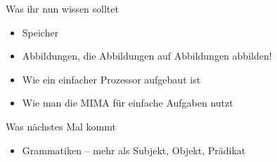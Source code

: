 


%







\begin{frame}	
	\begin{block}{Was ihr nun wissen solltet}
		\begin{itemize}
			\item Speicher
			\item Abbildungen, die Abbildungen auf Abbildungen abbilden!
			\item Wie ein einfacher Prozessor aufgebaut ist
			\item Wie man die MIMA für einfache Aufgaben nutzt
		\end{itemize}
	\end{block}
	
	\begin{block}{Was nächstes Mal kommt}
		\begin{itemize}
			\item Grammatiken – mehr als Subjekt, Objekt, Prädikat
		\end{itemize}
	\end{block}
\end{frame}


